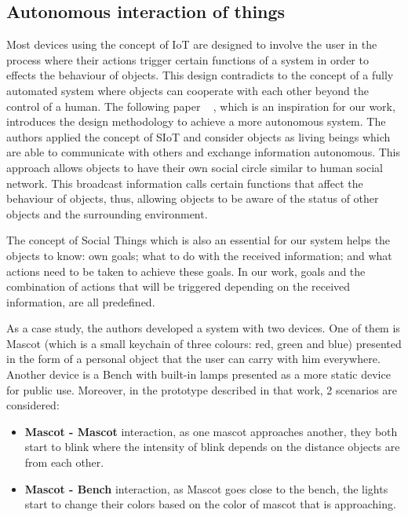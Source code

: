 \subsection{Autonomous interaction of things}
\label{sec:Autonomous interaction of things}
Most devices using the concept of IoT are designed to involve the user in the process where their actions trigger certain functions of a system in order to effects the behaviour of objects. This design contradicts to the concept of a fully automated system where objects can cooperate with each other beyond the control of a human. The following paper ~\cite{okada2016autonomous} , which is an inspiration for our work, introduces the design methodology to achieve a more autonomous system. The authors applied the concept of SIoT and consider objects as living beings which are able to communicate with others and exchange information autonomous. This approach allows objects to have their own social circle similar to human social network. This broadcast information calls certain functions that affect the behaviour of objects, thus, allowing objects to be aware of the status of other objects and the surrounding environment.
\par The concept of Social Things which is also an essential for our system helps the objects to know: own goals; what to do with the received information; and what actions need to be taken to achieve these goals. In our work, goals and the combination of actions that will be triggered depending on the received information, are all predefined.
\par As a case study, the authors developed a system with two devices. One of them is Mascot (which is a small keychain of three colours: red, green and blue) presented in the form of a personal object that the user can carry with him everywhere. Another device is a Bench with built-in lamps presented as a more static device for public use. Moreover, in the prototype described in that work, 2 scenarios are considered:
\begin{itemize}
  \item \textbf{Mascot - Mascot} interaction, as one mascot approaches another, they both start to blink where the intensity of blink depends on the distance objects are from each other.
  \item \textbf{Mascot - Bench} interaction, as Mascot goes close to the bench, the lights start to change their colors based on the color of mascot that is approaching.
\end{itemize}
